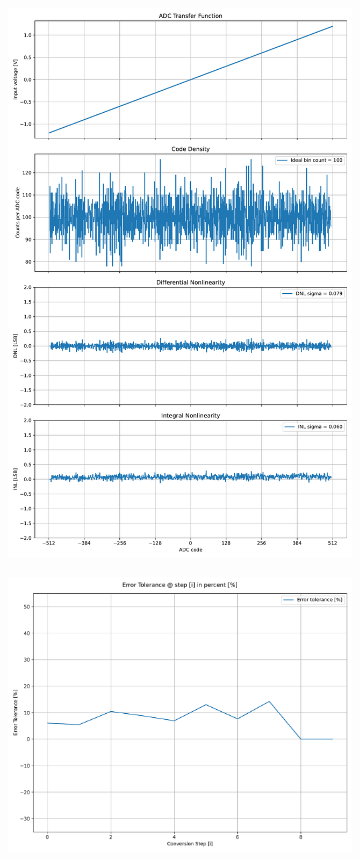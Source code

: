 \documentclass[varwidth]{standalone}
\begin{document}
\begin{figure}
\begin{subfigure}{0.32\textwidth}
    \includegraphics[width=\textwidth]{behavioral_10b_seterror_binrecomb_nonlinearity.pdf}
\end{subfigure}
\begin{subfigure}{0.32\textwidth}
    \includegraphics[width=\textwidth]{behavioral_10b_seterror_binrecomb_redundancy.pdf}

\end{subfigure}
\end{figure}
\end{document}
